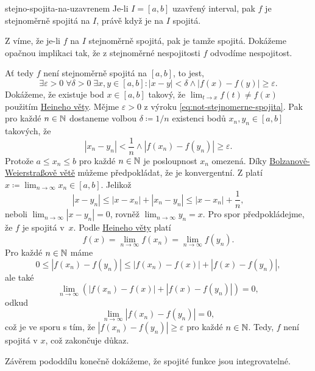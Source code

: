 \begin{theorem}{}{stejno-spojita-na-uzavrenem}
 Je-li $I = [a,b]$ uzavřený interval, pak $f$ je stejnoměrně spojitá na $I$,
 právě když je na $I$ spojitá.
\end{theorem}
\begin{thmproof}
 Z  víme, že je-li $f$ na $I$
 stejnoměrně spojitá, pak je tamže spojitá. Dokážeme opačnou implikaci tak, že z
 stejnoměrné nespojitosti $f$ odvodíme nespojitost.

 Ať tedy $f$ není stejnoměrně spojitá na $[a,b]$, to jest,
 \begin{equation}
  \label{eq:not-stejnomerne-spojita}
  \exists \varepsilon>0 \; \forall \delta>0 \; \exists x,y \in [a,b] : |x-y|
  <\delta \wedge |f(x) - f(y)| \geq \varepsilon.
 \end{equation}
 Dokážeme, že existuje bod $x \in [a,b]$ takový, že $\lim_{t \to x} f(t) \neq
 f(x)$ použitím \hyperref[cor:heineho-veta-pro-spojitost]{Heineho věty}. Mějme
 $\varepsilon>0$ z výroku \eqref{eq:not-stejnomerne-spojita}. Pak pro každé $n
 \in \mathbb{N}$ dostaneme volbou $\delta \coloneqq 1 / n$ existenci bodů $x_n,y_n \in
 [a,b]$ takových, že
 \[
  |x_n - y_n|<\frac{1}{n} \wedge |f(x_n) - f(y_n)| \geq \varepsilon.
 \]
 Protože $a \leq x_n \leq b$ pro každé $n \in \mathbb{N}$ je posloupnost $x_n$ omezená.
 Díky \hyperref[thm:bolzanova-weierstrassova]{Bolzanově-Weierstraßově větě}
 můžeme předpokládat, že je konvergentní. Z
  platí $x \coloneqq \lim_{n \to \infty}
 x_n \in [a,b]$. Jelikož
 \[
  |x-y_n| \leq |x-x_n| + |x_n-y_n| \leq |x-x_n| + \frac{1}{n},
 \]
 neboli $\lim_{n \to \infty} |x-y_n| = 0$, rovněž $\lim_{n \to \infty} y_n = x$.
 Pro spor předpokládejme, že $f$ je spojitá v~$x$. Podle
 \hyperref[cor:heineho-veta-pro-spojitost]{Heineho věty} platí
 \[
  f(x) = \lim_{n \to \infty} f(x_n) = \lim_{n \to \infty} f(y_n).
 \]
 Pro každé $n \in \mathbb{N}$ máme
 \[
  0 \leq |f(x_n) - f(y_n)| \leq |f(x_n) - f(x)| + |f(x) - f(y_n)|,
 \]
 ale také
 \[
  \lim_{n \to \infty} (|f(x_n) - f(x)| + |f(x) - f(y_n)|) = 0,
 \]
 odkud
 \[
  \lim_{n \to \infty} |f(x_n) - f(y_n)| = 0,
 \]
 což je ve sporu s tím, že $|f(x_n) - f(y_n)| \geq \varepsilon$ pro každé $n \in
 \mathbb{N}$. Tedy, $f$ není spojitá v $x$, což zakončuje důkaz.
\end{thmproof}

Závěrem pododdílu konečně dokážeme, že spojité funkce jsou integrovatelné.

